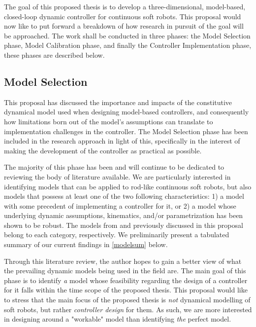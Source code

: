  The goal of this proposed thesis is to develop a three-dimensional, model-based, closed-loop dynamic controller for continuous soft robots. This proposal would now like to put forward a breakdown of how research in pursuit of the goal will be approached. The work shall be conducted in three phases: the Model Selection phase, Model Calibration phase, and finally the Controller Implementation phase, these phases are described below.   
\subsection{Model Selection}
This proposal has discussed the importance and impacts of the constitutive dynamical model used when designing model-based controllers, and consequently how limitations born out of the model's assumptions can translate to implementation challenges in the controller. The Model Selection phase has been included in the research approach in light of this, specifically in the interest of making the development of the controller as practical as possible.

The majority of this phase has been and will continue to be dedicated to reviewing the body of literature available. We are particularly interested in identifying models that can be applied to rod-like continuous soft robots, but also models that possess at least one of the two following characteristics: 1) a model with some precedent of implementing a controller for it, or 2) a model whose underlying dynamic assumptions, kinematics, and/or parametrization has been shown to be robust. The models from \cite{della_santina_model-based_2020} and \cite{della_santina_improved_2020} previously discussed in this proposal belong to each category, respectively. We preliminarily present a tabulated summary of our current findings in \autoref{modelsum} below.



Through this literature review, the author hopes to gain a better view of what the prevailing dynamic models being used in the field are. The main goal of this phase is to identify \textit{a} model whose feasibility regarding the design of a controller for it falls within the time scope of the proposed thesis. This proposal would like to stress that the main focus of the proposed thesis is \textit{not} dynamical modelling of soft robots, but rather \textit{controller design} for them. As such, we are more interested in designing around a "workable" model than identifying \textit{the} perfect model.    
